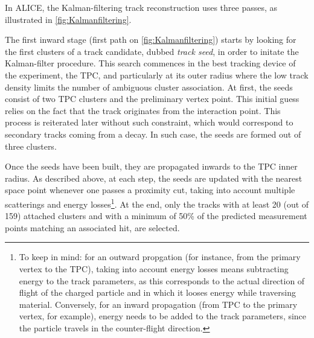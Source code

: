 In ALICE, the Kalman-filtering track reconstruction uses three passes, as illustrated in \fig\ref{fig:Kalmanfiltering}. 

The first inward stage (first path on \fig\ref{fig:Kalmanfiltering}) starts by looking for the first clusters of a track candidate, dubbed \textit{track seed}, in order to initate the Kalman-filter procedure. This search commences in the best tracking device of the experiment, \ie the TPC, and particularly at its outer radius where the low track density limits the number of ambiguous cluster association. At first, the seeds consist of two TPC clusters and the preliminary vertex point. This initial guess relies on the fact that the track originates from the interaction point. This process is reiterated later without such constraint, which would correspond to secondary tracks coming from a decay. In such case, the seeds are formed out of three clusters.

Once the seeds have been built, they are propagated inwards to the TPC inner radius.
As described above, at each step, the seeds are updated with the nearest space point whenever one passes a proximity cut, taking into account multiple scatterings and energy losses\footnote{To keep in mind: for an outward propgation (for instance, from the primary vertex to the TPC), taking into account energy losses means subtracting energy to the track parameters, as this corresponds to the actual direction of flight of the charged particle and in which it looses energy while traversing material. Conversely, for an inward propagation (from TPC to the primary vertex, for example), energy needs to be added to the track parameters, since the particle travels in the counter-flight direction.\label{footnote:EnergyLoss}}. At the end, only the tracks with at least 20 (out of 159) attached clusters and with a minimum of 50\% of the predicted measurement points matching an associated hit, are selected. 

